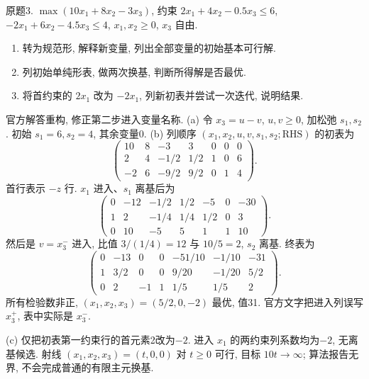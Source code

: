\begin{exercise}\label{ass:15053-rec2-q3}
原题3. $\max(10x_1+8x_2-3x_3)$, 约束 $2x_1+4x_2-0.5x_3\le6$, $-2x_1+6x_2-4.5x_3\le4$, $x_1,x_2\ge0$, $x_3$ 自由.
\begin{enumerate}[label=(\alph*)]
\item 转为规范形, 解释新变量, 列出全部变量的初始基本可行解.
\item 列初始单纯形表, 做两次换基, 判断所得解是否最优.
\item 将首约束的 $2x_1$ 改为 $-2x_1$, 列新初表并尝试一次迭代, 说明结果.
\end{enumerate}
\end{exercise}
\begin{solution}
官方解答重构, 修正第二步进入变量名称. (a) 令 $x_3=u-v$, $u,v\ge0$, 加松弛 $s_1,s_2$. 初始 $s_1=6,s_2=4$, 其余变量0. (b) 列顺序 $(x_1,x_2,u,v,s_1,s_2;\mathrm{RHS})$ 的初表为
\[
\begin{pmatrix}10&8&-3&3&0&0&0\\2&4&-1/2&1/2&1&0&6\\-2&6&-9/2&9/2&0&1&4\end{pmatrix}.
\]
首行表示 $-z$ 行. $x_1$ 进入、$s_1$ 离基后为
\[
\begin{pmatrix}0&-12&-1/2&1/2&-5&0&-30\\1&2&-1/4&1/4&1/2&0&3\\0&10&-5&5&1&1&10\end{pmatrix}.
\]
然后是 $v=x_3^-$ 进入, 比值 $3/(1/4)=12$ 与 $10/5=2$, $s_2$ 离基. 终表为
\[
\begin{pmatrix}0&-13&0&0&-51/10&-1/10&-31\\1&3/2&0&0&9/20&-1/20&5/2\\0&2&-1&1&1/5&1/5&2\end{pmatrix}.
\]
所有检验数非正, $(x_1,x_2,x_3)=(5/2,0,-2)$ 最优, 值31. 官方文字把进入列误写 $x_3^+$, 表中实际是 $x_3^-$.

(c) 仅把初表第一约束行的首元素2改为$-2$. 进入 $x_1$ 的两约束列系数均为$-2$, 无离基候选. 射线 $(x_1,x_2,x_3)=(t,0,0)$ 对 $t\ge0$ 可行, 目标 $10t\to\infty$; 算法报告无界, 不会完成普通的有限主元换基.
\end{solution}

